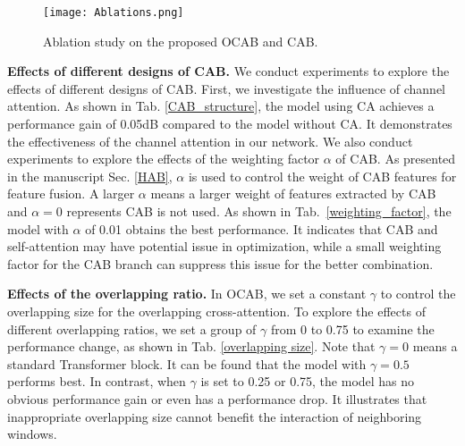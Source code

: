 \documentclass[10pt,twocolumn,letterpaper]{article}
\begin{document}
\begin{table}[!t]
\center
\begin{center}
\caption{Ablation study on the proposed OCAB and CAB.}
\vspace{-0.2cm}
\label{ablation_study_tab}
\end{center}
\vspace{-0.3cm}
\end{table}

\begin{figure}[!t]
\centering
\texttt{[image: Ablations.png]}
\vspace{-0.7cm}
\caption{Ablation study on the proposed OCAB and CAB. 
}
\label{ablation_study_fig}
\vspace{-0.7cm}
\end{figure}

\noindent
\textbf{Effects of different designs of CAB.} 
We conduct experiments to explore the effects of different designs of CAB. First, we investigate the influence of channel attention. As shown in Tab. \ref{CAB_structure}, the model using CA achieves a performance gain of 0.05dB compared to the model without CA. It demonstrates the effectiveness of the channel attention in our network. 
We also conduct experiments to explore the effects of the weighting factor $\alpha$ of CAB. As presented in the manuscript Sec. \ref{HAB}, $\alpha$ is used to control the weight of CAB features for feature fusion. A larger $\alpha$ means a larger weight of features extracted by CAB and $\alpha=0$ represents CAB is not used. As shown in Tab.~\ref{weighting_factor}, the model with $\alpha$ of 0.01 obtains the best performance. It indicates that CAB and self-attention may have potential issue in optimization, while a small weighting factor for the CAB branch can suppress this issue for the better combination.

\noindent
\textbf{Effects of the overlapping ratio.}
In OCAB, we set a constant $\gamma$ to control the overlapping size for the overlapping cross-attention. To explore the effects of different overlapping ratios, we set a group of $\gamma$ from 0 to 0.75 to examine the performance change, as shown in Tab. \ref{overlapping size}. Note that $\gamma=0$ means a standard Transformer block. It can be found that the model with $\gamma=0.5$ performs best. In contrast, when $\gamma$ is set to 0.25 or 0.75, the model has no obvious performance gain or even has a performance drop. It illustrates that inappropriate overlapping size cannot benefit the interaction of neighboring windows. 
\end{document}
